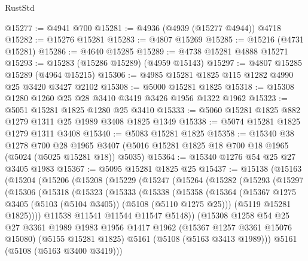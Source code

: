 \begin{lexlean}{RustStd}
\begin{coremodule}
@15277 := @4941 @700
@15281 := @4936 (@4939 (@15277 @4944)) @4718
@15282 := @15276 @15281
@15283 := @4807 @15269
@15285 := @15216 (@4731 @15281)
@15286 := @4640 @15285
@15289 := @4738 @15281 @4888 @15271
@15293 := @15283 (@15286 @15289) (@4959 @15143)
@15297 := @4807 @15285 @15289 (@4964 @15215)
@15306 := @4985 @15281 @1825 @115 @1282 @4990 @25 @3420 @3427 @2102
@15308 := @5000 @15281 @1825
@15318 := @15308 @1280 @1260 @25 @28 @3410 @3419 @3426 @1956 @1322 @1962
@15323 := @5051 @15281 @1825 @1280 @25 @3410
@15333 := @5060 @15281 @1825 @882 @1279 @1311 @25 @1989 @3408 @1825 @1349
@15338 := @5074 @15281 @1825 @1279 @1311 @3408
@15340 := @5083 @15281 @1825
@15358 := @15340
    @38
    @1278
    @700
    @28
    @1965
    @3407
    (@5016 @15281 @1825 @18 @700 @18 @1965 (@5024 (@5025 @15281 @18)) @5035)
@15364 := @15340 @1276 @54 @25 @27 @3405 @1983
@15367 := @5095 @15281 @1825 @25
@15437 := @15138
    (@15163
      (@15204
        (@15206
          (@15208
            (@15229
              (@15247
                (@15264
                  (@15282
                    (@15293
                      (@15297
                        (@15306
                          (@15318
                            (@15323
                              (@15333
                                (@15338
                                  (@15358
                                    (@15364
                                      (@15367
                                        @1275
                                        @3405
                                        (@5103 (@5104 @3405))
                                        (@5108 (@5110 @1275 @25)))
                                      (@5119 @15281 @1825))))
                                @11538
                                @11541
                                @11544
                                @11547
                                @5148))
                            (@15308
                              @1258
                              @54
                              @25
                              @27
                              @3361
                              @1989
                              @1983
                              @1956
                              @1417
                              @1962
                              (@15367 @1257 @3361 @15076 @15080)
                              (@5155 @15281 @1825)
                              @5161
                              (@5108 (@5163 @3413 @1989)))
                            @5161
                            (@5108 (@5163 @3400 @3419)))

\end{coremodule}
\end{lexlean}
